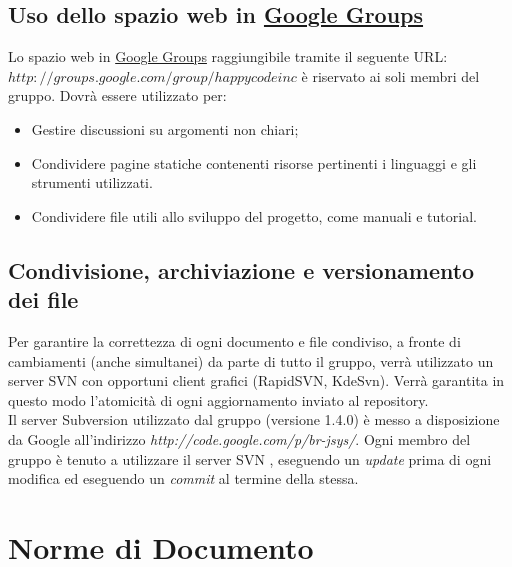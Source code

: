 \section{Uso dello spazio web in \underline{Google Groups}}
Lo spazio web in \underline{Google Groups} raggiungibile tramite il seguente URL: \({http://groups.google.com/group/happycodeinc}\) \`e riservato ai soli membri del gruppo. Dovr\`a essere utilizzato per:
\begin{itemize}
\item  Gestire discussioni su argomenti non chiari;
\item Condividere pagine statiche contenenti risorse pertinenti i linguaggi e gli strumenti utilizzati.
\item Condividere file utili allo sviluppo del progetto, come manuali e tutorial.
\end{itemize}

\section[Condivisione dei file]{Condivisione, archiviazione e versionamento dei file}
Per garantire la correttezza di ogni documento e file condiviso, a fronte di cambiamenti (anche simultanei) da parte di tutto il gruppo, verr\`a  utilizzato un server SVN con opportuni client grafici (RapidSVN, KdeSvn). Verr\`a garantita in questo modo l'atomicit\`a di ogni aggiornamento inviato al repository.\\ 
Il server Subversion utilizzato dal gruppo (versione 1.4.0) \`e messo a disposizione da Google all'indirizzo \textit{http://code.google.com/p/br-jsys/}.
\newline
 \newline
Ogni membro del gruppo \`e tenuto a utilizzare il server SVN , eseguendo un \textit{update} prima di ogni modifica ed eseguendo un \textit{commit} al termine della stessa.

\chapter{Norme di Documento}
